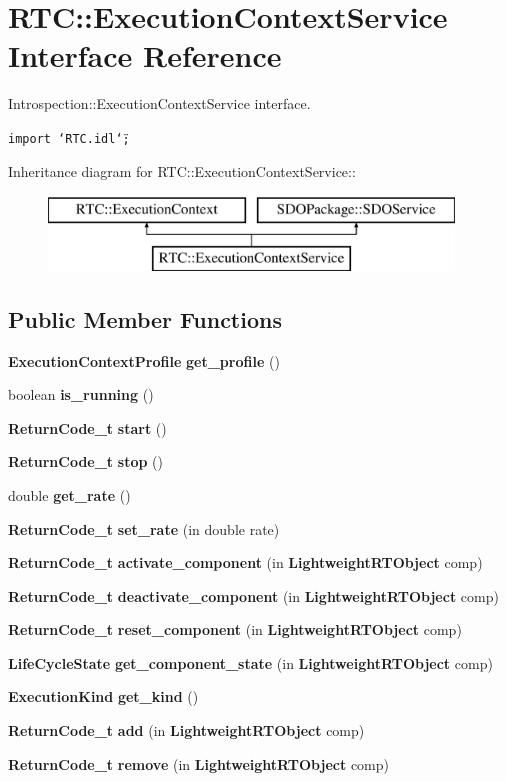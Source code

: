 \section{RTC::Execution\-Context\-Service Interface Reference}
\label{interfaceRTC_1_1ExecutionContextService}
Introspection::Execution\-Context\-Service interface.  


{\tt import \char`\"{}RTC.idl\char`\"{};}

Inheritance diagram for RTC::Execution\-Context\-Service::\begin{figure}[H]
\begin{center}
\leavevmode
\includegraphics[height=2cm]{interfaceRTC_1_1ExecutionContextService}
\end{center}
\end{figure}
\subsection*{Public Member Functions}
\begin{CompactItemize}
\item 
{\bf Execution\-Context\-Profile} {\bf get\_\-profile} ()
\item 
boolean {\bf is\_\-running} ()
\item 
{\bf Return\-Code\_\-t} {\bf start} ()
\item 
{\bf Return\-Code\_\-t} {\bf stop} ()
\item 
double {\bf get\_\-rate} ()
\item 
{\bf Return\-Code\_\-t} {\bf set\_\-rate} (in double rate)
\item 
{\bf Return\-Code\_\-t} {\bf activate\_\-component} (in {\bf Lightweight\-RTObject} comp)
\item 
{\bf Return\-Code\_\-t} {\bf deactivate\_\-component} (in {\bf Lightweight\-RTObject} comp)
\item 
{\bf Return\-Code\_\-t} {\bf reset\_\-component} (in {\bf Lightweight\-RTObject} comp)
\item 
{\bf Life\-Cycle\-State} {\bf get\_\-component\_\-state} (in {\bf Lightweight\-RTObject} comp)
\item 
{\bf Execution\-Kind} {\bf get\_\-kind} ()
\item 
{\bf Return\-Code\_\-t} {\bf add} (in {\bf Lightweight\-RTObject} comp)
\item 
{\bf Return\-Code\_\-t} {\bf remove} (in {\bf Lightweight\-RTObject} comp)
\end{CompactItemize}


